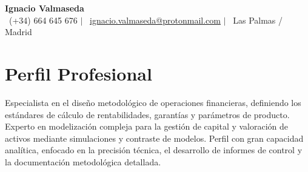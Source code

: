 \documentclass[a4paper,12pt]{article}
\begin{document}
\selectfont 

\begin{center}
    {\Huge \textbf{\color{SlateBlue} Ignacio Valmaseda}} \\ \vspace{3mm}
    \small 
    \faPhone\ (+34) 664 645 676 \hspace{0.3cm} {\color{SlateBlue}$|$} \hspace{0.3cm} 
    \faEnvelope\ \href{mailto:ignacio.valmaseda@protonmail.com}{ignacio.valmaseda@protonmail.com} \hspace{0.3cm} {\color{SlateBlue}$|$} \hspace{0.3cm} 
    \faMapMarker\ Las Palmas / Madrid
\end{center}

\vspace{-4mm}

\section{Perfil Profesional}
\vspace{1mm}
\small{Especialista en el diseño metodológico de operaciones financieras, definiendo los estándares de cálculo de rentabilidades, garantías y parámetros de producto. Experto en modelización compleja para la gestión de capital y valoración de activos mediante simulaciones y contraste de modelos. Perfil con gran capacidad analítica, enfocado en la precisión técnica, el desarrollo de informes de control y la documentación metodológica detallada.}

\end{document}
